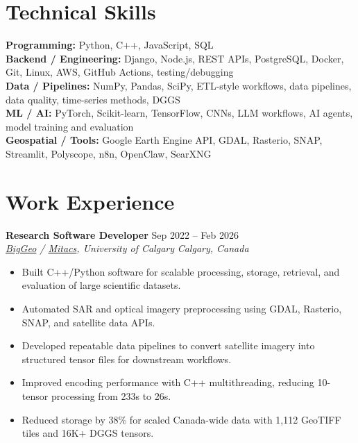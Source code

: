 \documentclass[a4paper,10pt]{article}
\newcommand{\resumeSubheading}[4]{
    \textbf{#1} \hfill #2 \\
    \textit{#3} \hfill \textit{#4}
}
\begin{document}
\section*{Technical Skills}

\textbf{Programming:} Python, C++, JavaScript, SQL \\
\textbf{Backend / Engineering:} Django, Node.js, REST APIs, PostgreSQL, Docker, Git, Linux, AWS, GitHub Actions, testing/debugging \\
\textbf{Data / Pipelines:} NumPy, Pandas, SciPy, ETL-style workflows, data pipelines, data quality, time-series methods, DGGS \\
\textbf{ML / AI:} PyTorch, Scikit-learn, TensorFlow, CNNs, LLM workflows, AI agents, model training and evaluation \\
\textbf{Geospatial / Tools:} Google Earth Engine API, GDAL, Rasterio, SNAP, Streamlit, Polyscope, n8n, OpenClaw, SearXNG


\section*{Work Experience}

\resumeSubheading
{Research Software Developer}
{Sep 2022 -- Feb 2026}
{\href{https://biggeo.com}{BigGeo} / \href{https://www.mitacs.ca/}{Mitacs}, University of Calgary}
{Calgary, Canada}
\begin{itemize}[leftmargin=0.25in]
    \item Built C++/Python software for scalable processing, storage, retrieval, and evaluation of large scientific datasets.
    \item Automated SAR and optical imagery preprocessing using GDAL, Rasterio, SNAP, and satellite data APIs.
    \item Developed repeatable data pipelines to convert satellite imagery into structured tensor files for downstream workflows.
    \item Improved encoding performance with C++ multithreading, reducing 10-tensor processing from 233s to 26s.
    \item Reduced storage by 38\% for scaled Canada-wide data with 1,112 GeoTIFF tiles and 16K+ DGGS tensors.
\end{itemize}
\end{document}
